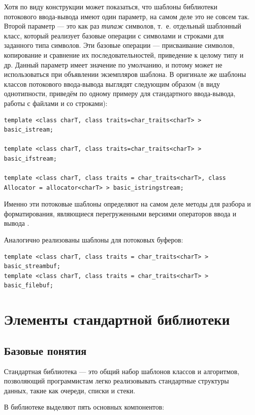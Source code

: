 Хотя по виду конструкции  может показаться, что шаблоны библиотеки потокового ввода-вывода
имеют один параметр, на самом деле это не совсем так.  Второй  параметр --- это как раз \emph{типаж }символов, т.~е.
отдельный шаблонный класс, который реализует базовые операции с символами и строками для заданного типа символов. Эти
базовые операции --- присваивание символов, копирование и сравнение их последовательностей, приведение к целому типу
и др. Данный параметр имеет значение по умолчанию, и потому может не использоваться при объявлении экземпляров шаблона.
В оригинале же шаблоны классов потокового ввода-вывода выглядят следующим образом (в виду однотипности, приведём по
одному примеру для стандартного ввода-вывода, работы с файлами и со строками):
\begin{lstlisting}
template <class charT, class traits=char_traits<charT> > basic_istream;

template <class charT, class traits=char_traits<charT> > basic_ifstream;

template <class charT, class traits = char_traits<charT>, class Allocator = allocator<charT> > basic_istringstream;
\end{lstlisting}

Именно эти потоковые шаблоны определяют на самом деле методы для разбора и форматирования, являющиеся перегруженными
версиями операторов ввода   и вывода
.

Аналогично реализованы шаблоны для потоковых буферов:
\begin{lstlisting}
template <class charT, class traits = char_traits<charT> > basic_streambuf;
template <class charT, class traits = char_traits<charT> > basic_filebuf;
\end{lstlisting}

\section[Элементы стандартной библиотеки \Sys{C++}]{Элементы стандартной библиотеки }
\subsection[Базовые понятия]{Базовые понятия}
Стандартная библиотека  --- это общий набор шаблонов классов и алгоритмов, позволяющий программистам легко
реализовывать стандартные структуры данных, такие как очереди, списки и стеки.

В библиотеке выделяют пять основных компонентов:

